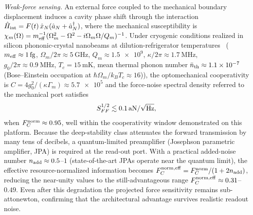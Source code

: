 \documentclass[aps,prxquantum,preprint,superscriptaddress,amsmath,amssymb]{revtex4-2}
\newcommand{\Fnorm}{F_C^{\rm norm}}
\newcommand{\Fnormeff}{F_C^{\rm norm,eff}}
\begin{document}
\textit{Weak-force sensing.} An external force coupled to the mechanical boundary displacement induces a cavity phase shift through the interaction $\hat{H}_{\rm int} = F(t)\,\hat{x}_N(\hat{a}_N + \hat{a}_N^\dagger)$, where the mechanical susceptibility is $\chi_m(\Omega) = m_{\rm eff}^{-1}(\Omega_m^2 - \Omega^2 - i\Omega_m\Omega/Q_m)^{-1}$. Under cryogenic conditions realized in silicon phononic-crystal nanobeams at dilution-refrigerator temperatures~\citep{MacCabe2020} ($m_{\rm eff}\approx\qty{1}{\femto\gram}$, $\Omega_m/2\pi\approx\qty{5}{\giga\hertz}$, $Q_m\approx\num{1.5e9}$, $\kappa/2\pi\approx\qty{1.7}{\mega\hertz}$, $g_0/2\pi\approx\qty{0.9}{\mega\hertz}$, $T_c=\qty{15}{\milli\kelvin}$, mean thermal phonon number $\bar{n}_{\rm th}\approx\num{1.1e-7}$ (Bose--Einstein occupation at $\hbar\Omega_m/k_B T_c\approx\num{16}$)), the optomechanical cooperativity is $C=4g_0^2/(\kappa\Gamma_m)\approx\num{5.7e5}$ and the force-noise spectral density referred to the mechanical port satisfies
\begin{equation}\label{eq:force_noise}
S_{FF}^{1/2}\lesssim\qty{0.1}{\atto\newton\per\sqrt{\hertz}},
\end{equation}
when $\Fnorm\approx\num{0.95}$, well within the cooperativity window demonstrated on this platform. Because the deep-stability class attenuates the forward transmission by many tens of decibels, a quantum-limited preamplifier (Josephson parametric amplifier, JPA) is required at the read-out port. With a practical added-noise number $n_{\rm add}\approx\num{0.5}$--$\num{1}$ (state-of-the-art JPAs operate near the quantum limit), the effective resource-normalized information becomes $\Fnormeff=\Fnorm/(1+2n_{\rm add})$, reducing the near-unity values to the still-advantageous range $\Fnormeff\approx\num{0.31}$--$\num{0.49}$. Even after this degradation the projected force sensitivity remains sub-attonewton, confirming that the architectural advantage survives realistic readout noise.
\end{document}

